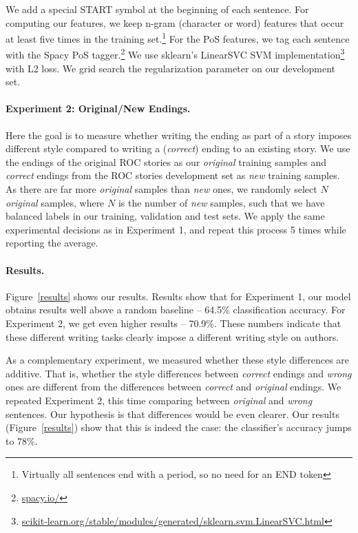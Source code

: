 \documentclass[11pt,a4paper]{article}
\newcommand{\figref}[1]{Figure~\ref{#1}}
\begin{document}
We add a special START symbol at the beginning of each sentence. 
For computing our features, we keep n-gram (character or word) features that occur at least five times in the training set.\footnote{Virtually all sentences end with a period, so no need for an END token}
For the PoS features, we tag each sentence with the Spacy PoS tagger.\footnote{\url{spacy.io/}}
We use  sklearn's LinearSVC SVM implementation\footnote{\url{scikit-learn.org/stable/modules/generated/sklearn.svm.LinearSVC.html}} 
with L2 loss. We grid search the regularization parameter on our development set. 

\paragraph{Experiment 2: Original/New Endings.}

Here the goal is to measure whether writing the ending as part of a story imposes different style compared to writing a ({\it correct}) ending to an existing story.
We use the endings of the original ROC stories as our {\it original} training samples and {\it correct} endings from the ROC stories development set as {\it new} training samples.
As there are far more {\it original} samples than {\it new} ones, we randomly select $N$ {\it original} samples, where $N$ is the number of {\it new} samples,
such that we have balanced labels in our training, validation and test sets.
We apply the same experimental decisions as in Experiment 1, and repeat this process 5 times while reporting the average.

\paragraph{Results.}
\figref{results} shows our results.
Results show that for Experiment 1, our model obtains results well above a random baseline -- 64.5\% classification accuracy. 
For Experiment 2, we get even higher results -- 70.9\%. 
These numbers indicate that these different writing tasks clearly impose a different writing style on authors. 

As a complementary experiment, we measured whether these style differences are additive. 
That is, whether the style differences between {\it correct} endings and {\it wrong} ones are different from the differences between {\it correct} and {\it original} endings.
We repeated Experiment 2, this time comparing between {\it original} and {\it wrong} sentences. 
Our hypothesis is that differences would be even clearer. 
Our results (\figref{results}) show that this is indeed the case: the classifier's accuracy jumps to 78\%.
\end{document}
